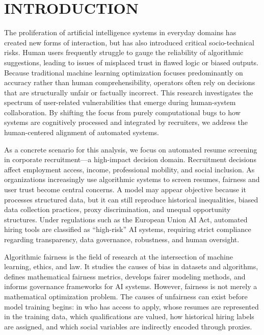 \documentclass[sigconf]{acmart}
\begin{document}
\maketitle

\section{INTRODUCTION}
The proliferation of artificial intelligence systems in everyday domains has created new forms of interaction, but has also introduced critical socio-technical risks. Human users frequently struggle to gauge the reliability of algorithmic suggestions, leading to issues of misplaced trust in flawed logic or biased outputs. Because traditional machine learning optimization focuses predominantly on accuracy rather than human comprehensibility, operators often rely on decisions that are structurally unfair or factually incorrect. This research investigates the spectrum of user-related vulnerabilities that emerge during human-system collaboration. By shifting the focus from purely computational bugs to how systems are cognitively processed and integrated by recruiters, we address the human-centered alignment of automated systems.

As a concrete scenario for this analysis, we focus on automated resume screening in corporate recruitment—a high-impact decision domain. Recruitment decisions affect employment access, income, professional mobility, and social inclusion. As organizations increasingly use algorithmic systems to screen resumes, fairness and user trust become central concerns. A model may appear objective because it processes structured data, but it can still reproduce historical inequalities, biased data collection practices, proxy discrimination, and unequal opportunity structures. Under regulations such as the European Union AI Act, automated hiring tools are classified as ``high-risk'' AI systems, requiring strict compliance regarding transparency, data governance, robustness, and human oversight.

Algorithmic fairness is the field of research at the intersection of machine learning, ethics, and law. It studies the causes of bias in datasets and algorithms, defines mathematical fairness metrics, develops fairer modeling methods, and informs governance frameworks for AI systems. However, fairness is not merely a mathematical optimization problem. The causes of unfairness can exist before model training begins: in who has access to apply, whose resumes are represented in the training data, which qualifications are valued, how historical hiring labels are assigned, and which social variables are indirectly encoded through proxies. 
\end{document}
